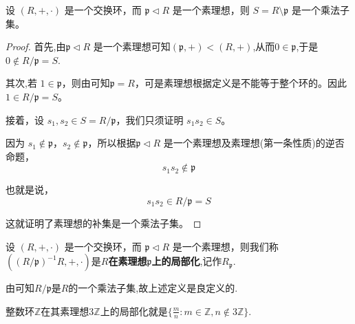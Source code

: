 \documentclass[../../main.tex]{subfiles}
\begin{document}
\begin{lemma}\label{lemma:交换环上的素理想的补集是乘法子集}
设 $(R, +, \cdot)$ 是一个交换环，而 $\mathfrak{p} \lhd  R$ 是一个素理想，则 $S = R \setminus \mathfrak{p}$ 是一个乘法子集。
\end{lemma}
\begin{proof}
首先,由$\mathfrak{p} \lhd  R$ 是一个素理想可知$(\mathfrak{p},+)<(R,+)$,从而$0\in \mathfrak{p}$,于是$0\notin R/\mathfrak{p}=S$.

其次,若 $1 \in \mathfrak{p}$，则由可知$\mathfrak{p} = R$，可是素理想根据定义是不能等于整个环的。因此 $1 \in R/\mathfrak{p}=S$。

接着，设 $s_1, s_2 \in S=R/\mathfrak{p}$，我们只须证明 $s_1s_2 \in S$。

因为 $s_1 \notin \mathfrak{p}$，$s_2 \notin \mathfrak{p}$，所以根据$\mathfrak{p} \lhd  R$ 是一个素理想及素理想(第一条性质)的逆否命题，
\[s_1s_2 \notin \mathfrak{p}\]

也就是说，
\[s_1s_2 \in R/\mathfrak{p}=S\]

这就证明了素理想的补集是一个乘法子集。
\end{proof}

\begin{definition}
设 $(R, +, \cdot)$ 是一个交换环，而 $\mathfrak{p} \lhd  R$ 是一个素理想，则我们称$((R/\mathfrak{p})^{-1}R,+,\cdot)$是\textbf{$R$在素理想$\mathfrak{p}$上的局部化},记作$R_{\mathfrak{p}}.$
\end{definition}
\begin{remark}
由可知$R/\mathfrak{p}$是$R$的一个乘法子集,故上述定义是良定义的.
\end{remark}
\begin{note}
整数环$\mathbb{Z}$在其素理想$3\mathbb{Z}$上的局部化就是$\{\frac{m}{n}:m\in \mathbb{Z},n\notin 3\mathbb{Z}\}.$
\end{note}
\end{document}
